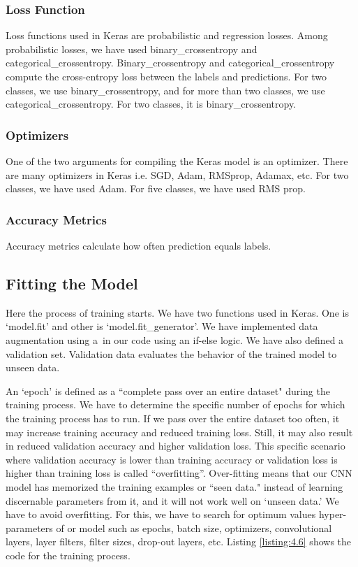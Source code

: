 \subsubsection*{Loss Function}
Loss functions used in Keras are probabilistic and regression losses. 
Among probabilistic losses, we have used binary\_crossentropy and
categorical\_crossentropy. Binary\_crossentropy and categorical\_crossentropy
compute the cross-entropy loss between the labels and predictions.
For two classes, we use binary\_crossentropy, and for more than two classes, we use categorical\_crossentropy. For two
classes, it is binary\_crossentropy. 
\subsubsection*{Optimizers}
One of the two arguments for compiling the Keras model is
an optimizer. There are many optimizers in Keras i.e.
SGD, Adam, RMSprop, Adamax, etc. For two classes, we have used Adam. For five classes,
we have used RMS prop.
\subsubsection*{Accuracy Metrics}
Accuracy metrics calculate how
often prediction equals labels.
\subsection{Fitting the Model}
Here the process of training starts. We have two functions used in Keras. One
is `model.fit' and other is `model.fit\_generator'. We have implemented data augmentation using a\
in our code using an if-else logic. We have also defined a validation set.
Validation data evaluates the behavior of the trained model to unseen data.

An `epoch' is defined as a ``complete pass over an entire dataset" during the training process.
We have to determine the specific number of epochs for which the training process has to
run. If we pass over the entire dataset too often,
it may increase training accuracy and reduced training loss. Still, it may also result in reduced validation accuracy and higher validation loss.
This specific scenario where validation accuracy is lower
than training accuracy or validation loss is higher than
training loss is called ``overfitting''. Over-fitting means that our
CNN model has memorized the training examples or ``seen data."
instead of learning discernable parameters from it,
and it will not work well on `unseen data.' We have to avoid overfitting. For this, we have to search for
optimum values hyper-parameters of or model such as epochs,
batch size, optimizers, convolutional layers,
layer filters, filter sizes, drop-out layers, etc.
Listing \ref{listing:4.6} shows the code for the training process.

